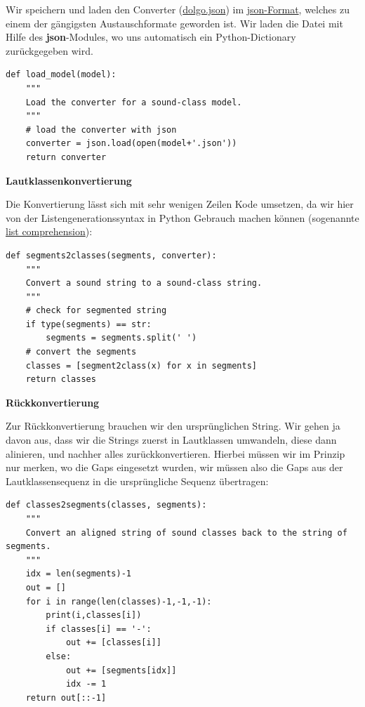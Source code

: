 Wir speichern und laden den Converter
(\href{https://github.com/LinguList/pyjs-seminar/blob/master/website/code/dolgo.json}{dolgo.json})
im \href{http://de.wikipedia.org/wiki/json}{json-Format}, welches zu
einem der gängigsten Austauschformate geworden ist. Wir laden die Datei
mit Hilfe des \textbf{json}-Modules, wo uns automatisch ein
Python-Dictionary zurückgegeben wird.

\begin{verbatim}
def load_model(model):
    """
    Load the converter for a sound-class model.
    """
    # load the converter with json
    converter = json.load(open(model+'.json'))
    return converter
\end{verbatim}





\vspace{0.5cm}\par\noindent\textbf{Lautklassenkonvertierung}\vspace{0.5cm}

Die Konvertierung lässt sich mit sehr wenigen Zeilen Kode umsetzen, da
wir hier von der Listengenerationssyntax in Python Gebrauch machen
können (sogenannte
\href{http://www.secnetix.de/olli/Python/list_comprehensions.hawk}{list
comprehension}):

\begin{verbatim}
def segments2classes(segments, converter):
    """
    Convert a sound string to a sound-class string.
    """
    # check for segmented string
    if type(segments) == str:
        segments = segments.split(' ')
    # convert the segments
    classes = [segment2class(x) for x in segments]
    return classes
\end{verbatim}





\vspace{0.5cm}\par\noindent\textbf{Rückkonvertierung}\vspace{0.5cm}

Zur Rückkonvertierung brauchen wir den ursprünglichen String. Wir gehen
ja davon aus, dass wir die Strings zuerst in Lautklassen umwandeln,
diese dann alinieren, und nachher alles zurückkonvertieren. Hierbei
müssen wir im Prinzip nur merken, wo die Gaps eingesetzt wurden, wir
müssen also die Gaps aus der Lautklassensequenz in die ursprüngliche
Sequenz übertragen:

\begin{verbatim}
def classes2segments(classes, segments):
    """
    Convert an aligned string of sound classes back to the string of segments.
    """
    idx = len(segments)-1
    out = []
    for i in range(len(classes)-1,-1,-1):
        print(i,classes[i])
        if classes[i] == '-':
            out += [classes[i]]
        else:
            out += [segments[idx]]
            idx -= 1  
    return out[::-1] 
\end{verbatim}





